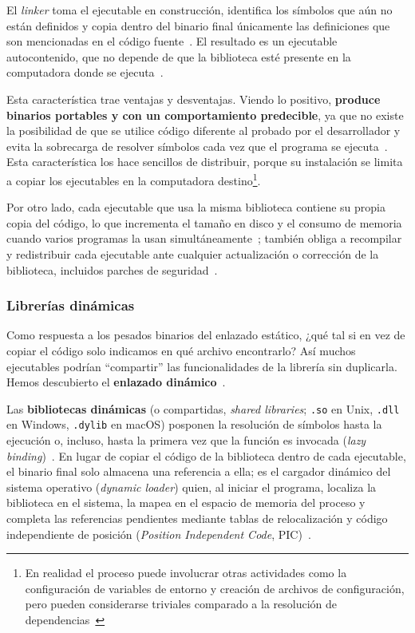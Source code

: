 El \emph{linker} toma el ejecutable en construcción, identifica los símbolos que aún no están definidos y copia dentro del binario final únicamente las definiciones que son mencionadas en el código fuente~\cite{usenixassociation1986SummerUSENIX1986}. El resultado es un ejecutable autocontenido, que no depende de que la biblioteca esté presente en la computadora donde se ejecuta~\cite{beazleyStorySharedLibraries2001}.

Esta característica trae ventajas y desventajas. Viendo lo positivo, \textbf{produce binarios portables y con un comportamiento predecible}, ya que no existe la posibilidad de que se utilice código diferente al probado por el desarrollador y evita la sobrecarga de resolver símbolos cada vez que el programa se ejecuta~\cite{beazleyStorySharedLibraries2001}. Esta característica los hace sencillos de distribuir, porque su instalación se limita a copiar los ejecutables en la computadora destino\footnote{En realidad el proceso puede involucrar otras actividades como la configuración de variables de entorno y creación de archivos de configuración, pero pueden considerarse triviales comparado a la resolución de dependencias~\cite{Dolstra2006}}.

Por otro lado, cada ejecutable que usa la misma biblioteca contiene su propia copia del código, lo que incrementa el tamaño en disco y el consumo de memoria cuando varios programas la usan simultáneamente~\cite{usenixassociation1986SummerUSENIX1986}; también obliga a recompilar y redistribuir cada ejecutable ante cualquier actualización o corrección de la biblioteca, incluidos parches de seguridad~\cite{beazleyStorySharedLibraries2001}.

\subsubsection{Librerías dinámicas}

Como respuesta a los pesados binarios del enlazado estático, ¿qué tal si en vez de copiar el código solo indicamos en qué archivo encontrarlo? Así muchos ejecutables podrían ``compartir'' las funcionalidades de la librería sin duplicarla. Hemos descubierto el \textbf{enlazado dinámico}~\cite{usenixassociation1986SummerUSENIX1986}.

Las \textbf{bibliotecas dinámicas} (o compartidas, \emph{shared libraries}; \texttt{.so} en Unix, \texttt{.dll} en Windows, \texttt{.dylib} en macOS) posponen la resolución de símbolos hasta la ejecución o, incluso, hasta la primera vez que la función es invocada (\emph{lazy binding})~\cite{beazleyStorySharedLibraries2001}. En lugar de copiar el código de la biblioteca dentro de cada ejecutable, el binario final solo almacena una referencia a ella; es el cargador dinámico del sistema operativo (\emph{dynamic loader}) quien, al iniciar el programa, localiza la biblioteca en el sistema, la mapea en el espacio de memoria del proceso y completa las referencias pendientes mediante tablas de relocalización y código independiente de posición (\emph{Position Independent Code}, PIC)~\cite{beazleyStorySharedLibraries2001}.

